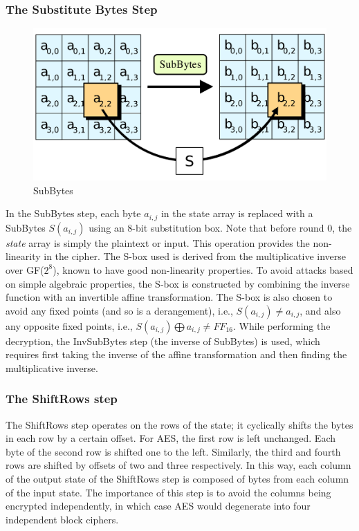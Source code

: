 \documentclass[11pt]{article}
\begin{document}
\subsubsection{The Substitute Bytes Step}

\begin{figure}[h!]
\centering
\includegraphics[scale=0.20]{subbytes}
\caption{SubBytes}
\label{fig:subbytes}
\end{figure}

In the SubBytes step, each byte $a_{i, j}$ in the state array is replaced with a SubBytes $S(a_{i, j})$ using an 8-bit substitution box. Note that before round 0, the \textit{state} array is simply the plaintext or input. This operation provides the non-linearity in the cipher. The S-box used is derived from the multiplicative inverse over GF($2^8$), known to have good non-linearity properties. To avoid attacks based on simple algebraic properties, the S-box is constructed by combining the inverse function with an invertible affine transformation. The S-box is also chosen to avoid any fixed points (and so is a derangement), i.e., $S(a_{i, j}) \neq a_{i, j}$, and also any opposite fixed points, i.e., $S(a_{i, j}) \bigoplus a_{i, j} \neq FF_{16}$. While performing the decryption, the InvSubBytes step (the inverse of SubBytes) is used, which requires first taking the inverse of the affine transformation and then finding the multiplicative inverse.

\subsubsection{The ShiftRows step}

The ShiftRows step operates on the rows of the state; it cyclically shifts the bytes in each row by a certain offset. For AES, the first row is left unchanged. Each byte of the second row is shifted one to the left. Similarly, the third and fourth rows are shifted by offsets of two and three respectively. In this way, each column of the output state of the ShiftRows step is composed of bytes from each column of the input state. The importance of this step is to avoid the columns being encrypted independently, in which case AES would degenerate into four independent block ciphers.
\end{document}
